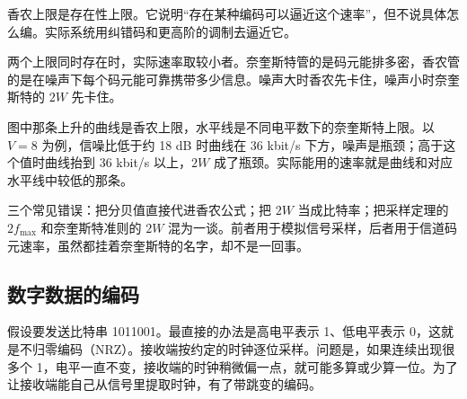 香农上限是存在性上限。它说明“存在某种编码可以逼近这个速率”，但不说具体怎么编。实际系统用纠错码和更高阶的调制去逼近它。

两个上限同时存在时，实际速率取较小者。奈奎斯特管的是码元能排多密，香农管的是在噪声下每个码元能可靠携带多少信息。噪声大时香农先卡住，噪声小时奈奎斯特的 $2W$ 先卡住。

\begin{center}
\end{center}

图中那条上升的曲线是香农上限，水平线是不同电平数下的奈奎斯特上限。以 $V=8$ 为例，信噪比低于约 18 dB 时曲线在 36 kbit/s 下方，噪声是瓶颈；高于这个值时曲线抬到 36 kbit/s 以上，$2W$ 成了瓶颈。实际能用的速率就是曲线和对应水平线中较低的那条。

\begin{attention}
三个常见错误：把分贝值直接代进香农公式；把 $2W$ 当成比特率；把采样定理的 $2f_{\max}$ 和奈奎斯特准则的 $2W$ 混为一谈。前者用于模拟信号采样，后者用于信道码元速率，虽然都挂着奈奎斯特的名字，却不是一回事。
\end{attention}

\subsection{数字数据的编码}

假设要发送比特串 1011001。最直接的办法是高电平表示 1、低电平表示 0，这就是不归零编码（NRZ）。接收端按约定的时钟逐位采样。问题是，如果连续出现很多个 1，电平一直不变，接收端的时钟稍微偏一点，就可能多算或少算一位。为了让接收端能自己从信号里提取时钟，有了带跳变的编码。

